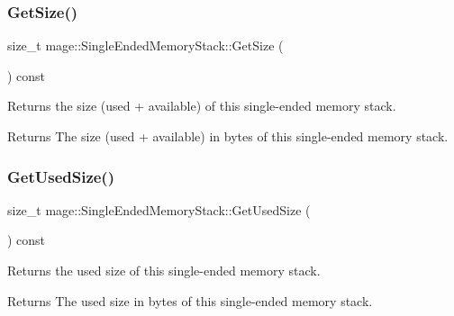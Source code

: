 \subsubsection{\texorpdfstring{Get\+Size()}{GetSize()}}
{\footnotesize\ttfamily size\+\_\+t mage\+::\+Single\+Ended\+Memory\+Stack\+::\+Get\+Size (\begin{DoxyParamCaption}{ }\end{DoxyParamCaption}) const\hspace{0.3cm}{\ttfamily [noexcept]}}

Returns the size (used + available) of this single-\/ended memory stack.

\begin{DoxyReturn}{Returns}
The size (used + available) in bytes of this single-\/ended memory stack. 
\end{DoxyReturn}
\mbox{\label{classmage_1_1_single_ended_memory_stack_ab2b07a4cf2c9eb9988ad49174e0804ac}} 
\subsubsection{\texorpdfstring{Get\+Used\+Size()}{GetUsedSize()}}
{\footnotesize\ttfamily size\+\_\+t mage\+::\+Single\+Ended\+Memory\+Stack\+::\+Get\+Used\+Size (\begin{DoxyParamCaption}{ }\end{DoxyParamCaption}) const\hspace{0.3cm}{\ttfamily [noexcept]}}

Returns the used size of this single-\/ended memory stack.

\begin{DoxyReturn}{Returns}
The used size in bytes of this single-\/ended memory stack. 
\end{DoxyReturn}
\mbox{\label{classmage_1_1_single_ended_memory_stack_a709db7d21cd2db6e98acd7985770468e}} 
